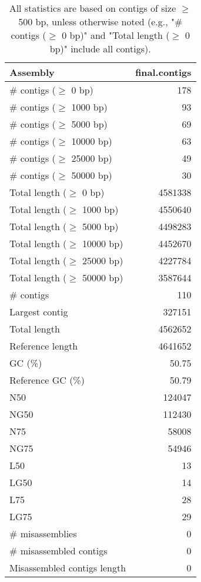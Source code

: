\documentclass[12pt,a4paper]{article}
\begin{document}
\begin{table}[ht]
\begin{center}
\caption{All statistics are based on contigs of size $\geq$ 500 bp, unless otherwise noted (e.g., "\# contigs ($\geq$ 0 bp)" and "Total length ($\geq$ 0 bp)" include all contigs).}
\begin{tabular}{|l*{1}{|r}|}
\hline
Assembly & final.contigs \\ \hline
\# contigs ($\geq$ 0 bp) & 178 \\ \hline
\# contigs ($\geq$ 1000 bp) & 93 \\ \hline
\# contigs ($\geq$ 5000 bp) & 69 \\ \hline
\# contigs ($\geq$ 10000 bp) & 63 \\ \hline
\# contigs ($\geq$ 25000 bp) & 49 \\ \hline
\# contigs ($\geq$ 50000 bp) & 30 \\ \hline
Total length ($\geq$ 0 bp) & 4581338 \\ \hline
Total length ($\geq$ 1000 bp) & 4550640 \\ \hline
Total length ($\geq$ 5000 bp) & 4498283 \\ \hline
Total length ($\geq$ 10000 bp) & 4452670 \\ \hline
Total length ($\geq$ 25000 bp) & 4227784 \\ \hline
Total length ($\geq$ 50000 bp) & 3587644 \\ \hline
\# contigs & 110 \\ \hline
Largest contig & 327151 \\ \hline
Total length & 4562652 \\ \hline
Reference length & 4641652 \\ \hline
GC (\%) & 50.75 \\ \hline
Reference GC (\%) & 50.79 \\ \hline
N50 & 124047 \\ \hline
NG50 & 112430 \\ \hline
N75 & 58008 \\ \hline
NG75 & 54946 \\ \hline
L50 & 13 \\ \hline
LG50 & 14 \\ \hline
L75 & 28 \\ \hline
LG75 & 29 \\ \hline
\# misassemblies & 0 \\ \hline
\# misassembled contigs & 0 \\ \hline
Misassembled contigs length & 0 \\ \hline

\end{tabular}
\end{center}
\end{table}
\end{document}
